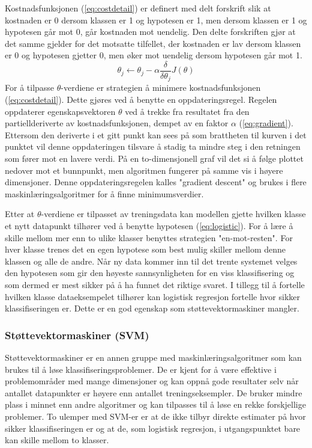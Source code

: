Kostnadsfunksjonen (\ref{eq:costdetail}) er definert med delt forskrift slik at kostnaden er 0 dersom klassen er 1 og hypotesen er 1, men dersom klassen er 1 og hypotesen går mot 0, går kostnaden mot uendelig. Den delte forskriften gjør at det samme gjelder for det motsatte tilfellet, der kostnaden er lav dersom klassen er 0 og hypotesen gjetter 0, men øker mot uendelig dersom hypotesen går mot 1.
\begin{equation}
\theta_j \leftarrow \theta_j - \alpha \frac{\delta}{\delta\theta_j}J(\theta)
\label{eq:gradient}
\end{equation}
For å tilpasse $\theta$-verdiene er strategien å minimere kostnadsfunksjonen (\ref{eq:costdetail}). Dette gjøres ved å benytte en oppdateringsregel. Regelen oppdaterer egenskapsvektoren $\theta$ ved å trekke fra resultatet fra den partiellderiverte av kostnadsfunksjonen, dempet av en faktor $\alpha$ (\ref{eq:gradient}). Ettersom den deriverte i et gitt punkt kan sees på som brattheten til kurven i det punktet vil denne oppdateringen tilsvare å stadig ta mindre steg i den retningen som fører mot en lavere verdi. På en to-dimensjonell graf vil det si å følge plottet nedover mot et bunnpunkt, men algoritmen fungerer på samme vis i høyere dimensjoner. Denne oppdateringsregelen kalles "gradient descent" og brukes i flere maskinlæringsalgoritmer for å finne minimumsverdier.

Etter at $\theta$-verdiene er tilpasset av treningsdata kan modellen gjette hvilken klasse et nytt datapunkt tilhører ved å benytte hypotesen (\ref{eq:logistic}). For å lære å skille mellom mer enn to ulike klasser benyttes strategien "en-mot-resten". For hver klasse trenes det en egen hypotese som best mulig skiller mellom denne klassen og alle de andre. Når ny data kommer inn til det trente systemet velges den hypotesen som gir den høyeste sannsynligheten for en viss klassifisering og som dermed er mest sikker på å ha funnet det riktige svaret. I tillegg til å fortelle hvilken klasse dataeksempelet tilhører kan logistisk regresjon fortelle hvor sikker klassifiseringen er. Dette er en god egenskap som støttevektormaskiner mangler.\\

\subsubsection*{Støttevektormaskiner (SVM)}
Støttevektormaskiner er en annen gruppe med maskinlæringsalgoritmer som kan brukes til å løse klassifiseringsproblemer. De er kjent for å være effektive i problemområder med mange dimensjoner og kan oppnå gode resultater selv når antallet datapunkter er høyere enn antallet treningseksempler. De bruker mindre plass i minnet enn andre algoritmer og kan tilpasses til å løse en rekke forskjellige problemer. To ulemper med SVM-er er at de ikke tilbyr direkte estimater på hvor sikker klassifiseringen er og at de, som logistisk regresjon, i utgangspunktet bare kan skille mellom to klasser.


